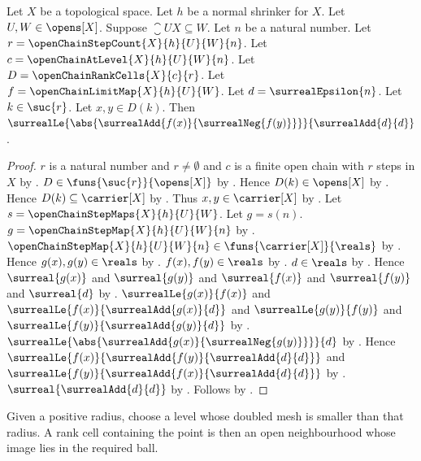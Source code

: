 \begin{lemma}\label{open_chain_limit_map_cell_oscillation}
    Let $X$ be a topological space.
    Let $h$ be a normal shrinker for $X$.
    Let $U,W\in\opens[X]$.
    Suppose $\closure{U}{X}\subseteq W$.
    Let $n$ be a natural number.
    Let $r=\openChainStepCount{X}{h}{U}{W}{n}$.
    Let $c=\openChainAtLevel{X}{h}{U}{W}{n}$.
    Let $D=\openChainRankCells{X}{c}{r}$.
    Let $f=\openChainLimitMap{X}{h}{U}{W}$.
    Let $d=\surrealEpsilon{n}$.
    Let $k\in\suc{r}$.
    Let $x,y\in D(k)$.
    Then $\surrealLe{\abs{\surrealAdd{f(x)}{\surrealNeg{f(y)}}}}
        {\surrealAdd{d}{d}}$.
\end{lemma}
\begin{proof}
    $r$ is a natural number and $r\neq\emptyset$ and
        $c$ is a finite open chain with $r$ steps in $X$
        by .
    $D\in\funs{\suc{r}}{\opens[X]}$
        by .
    Hence $D(k)\in\opens[X]$ by .
    Hence $D(k)\subseteq\carrier[X]$
        by .
    Thus $x,y\in\carrier[X]$ by .
    Let $s=\openChainStepMaps{X}{h}{U}{W}$.
    Let $g=s(n)$.
    $g=\openChainStepMap{X}{h}{U}{W}{n}$
        by .
    $\openChainStepMap{X}{h}{U}{W}{n}
        \in\funs{\carrier[X]}{\reals}$
        by .
    Hence $g(x),g(y)\in\reals$ by .
    $f(x),f(y)\in\reals$
        by .
    $d\in\reals$ by .
    Hence $\surreal{g(x)}$ and $\surreal{g(y)}$ and
        $\surreal{f(x)}$ and $\surreal{f(y)}$ and $\surreal{d}$
        by .
    $\surrealLe{g(x)}{f(x)}$ and
        $\surrealLe{f(x)}{\surrealAdd{g(x)}{d}}$ and
        $\surrealLe{g(y)}{f(y)}$ and
        $\surrealLe{f(y)}{\surrealAdd{g(y)}{d}}$
        by .
    $\surrealLe{\abs{\surrealAdd{g(x)}{\surrealNeg{g(y)}}}}{d}$
        by .
    Hence $\surrealLe{f(x)}{\surrealAdd{f(y)}{\surrealAdd{d}{d}}}$ and
        $\surrealLe{f(y)}{\surrealAdd{f(x)}{\surrealAdd{d}{d}}}$
        by .
    $\surreal{\surrealAdd{d}{d}}$ by .
    Follows by .
\end{proof}

Given a positive radius, choose a level whose doubled mesh is smaller than
that radius. A rank cell containing the point is then an open neighbourhood
whose image lies in the required ball.

